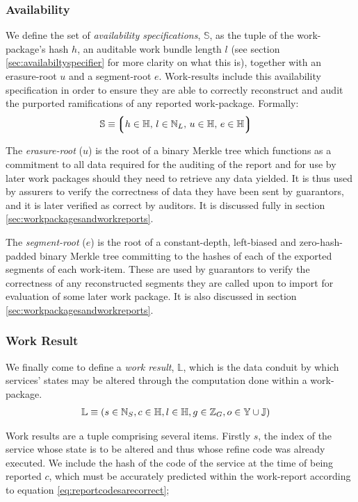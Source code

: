 \subsubsection{Availability}
We define the set of \emph{availability specifications}, $\mathbb{S}$, as the tuple of the work-package's hash $h$, an auditable work bundle length $l$ (see section \ref{sec:availabiltyspecifier} for more clarity on what this is), together with an erasure-root $u$ and a segment-root $e$. Work-results include this availability specification in order to ensure they are able to correctly reconstruct and audit the purported ramifications of any reported work-package. Formally:
\begin{align}
  \mathbb{S} &\equiv \tuple{
    \isa{h}{\H}\ts
    \isa{l}{\N_L}\ts
    \isa{u}{\H}\ts
    \isa{e}{\H}
  }
\end{align}

The \emph{erasure-root} ($u$) is the root of a binary Merkle tree which functions as a commitment to all data required for the auditing of the report and for use by later work packages should they need to retrieve any data yielded. It is thus used by assurers to verify the correctness of data they have been sent by guarantors, and it is later verified as correct by auditors. It is discussed fully in section \ref{sec:workpackagesandworkreports}.

The \emph{segment-root} ($e$) is the root of a constant-depth, left-biased and zero-hash-padded binary Merkle tree committing to the hashes of each of the exported segments of each work-item. These are used by guarantors to verify the correctness of any reconstructed segments they are called upon to import for evaluation of some later work package. It is also discussed in section \ref{sec:workpackagesandworkreports}.

\subsubsection{Work Result}
We finally come to define a \emph{work result}, $\mathbb{L}$, which is the data conduit by which services' states may be altered through the computation done within a work-package.
\begin{align}\label{eq:workresult}
  \mathbb{L} &\equiv (s \in \mathbb{N}_S, c \in \mathbb{H}, l \in \mathbb{H}, g \in \mathbb{Z}_G, o \in \mathbb{Y} \cup \mathbb{J})
\end{align}

Work results are a tuple comprising several items. Firstly $s$, the index of the service whose state is to be altered and thus whose refine code was already executed. We include the hash of the code of the service at the time of being reported $c$, which must be accurately predicted within the work-report according to equation \ref{eq:reportcodesarecorrect};

